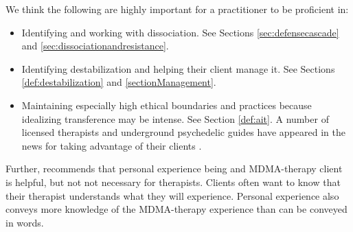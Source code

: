 \documentclass[12pt,letterpaper]{book}
\begin{document}
We think the following are highly important for a practitioner to be proficient in:
\begin{itemize}
    \item Identifying and working with dissociation. See Sections \ref{sec:defensecascade} and \ref{sec:dissociationandresistance}.
    \item Identifying destabilization and helping their client manage it. See Sections \ref{def:destabilization} and \ref{sectionManagement}.
    \item Maintaining especially high ethical boundaries and practices because idealizing transference may be intense. See Section \ref{def:ait}. A number of licensed therapists and underground psychedelic guides have appeared in the news for taking advantage of their clients \cite{powerTrip}.
\end{itemize}
Further, \textcite{simmering} recommends that personal experience being and MDMA-therapy client is helpful, but not not necessary for therapists. Clients often want to know that their therapist understands what they will experience. Personal experience also conveys more knowledge of the MDMA-therapy experience than can be conveyed in words.
\end{document}
